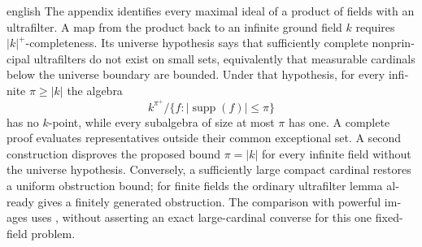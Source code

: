 \begin{otherlanguage}{english}
\begin{otherlanguage*}{english}
The appendix identifies every maximal ideal of a product of fields with an ultrafilter. A map from the product back to an infinite ground field $k$ requires $|k|^+$-completeness. Its universe hypothesis says that sufficiently complete nonprincipal ultrafilters do not exist on small sets, equivalently that measurable cardinals below the universe boundary are bounded. Under that hypothesis, for every infinite $\pi\ge |k|$ the algebra
\[
 k^{\pi^+}/\{f:|\operatorname{supp}(f)|\le\pi\}
\]
has no $k$-point, while every subalgebra of size at most $\pi$ has one. A complete proof evaluates representatives outside their common exceptional set. A second construction disproves the proposed bound $\pi=|k|$ for every infinite field without the universe hypothesis. Conversely, a sufficiently large compact cardinal restores a uniform obstruction bound; for finite fields the ordinary ultrafilter lemma already gives a finitely generated obstruction. The comparison with powerful images uses \citet{BrookeTaylorRosicky2017}, without asserting an exact large-cardinal converse for this one fixed-field problem.

\end{otherlanguage*}
\end{otherlanguage}
\dgrchunkend
